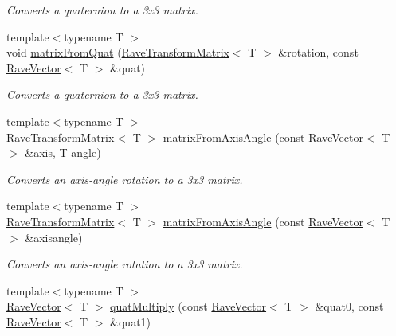 \begin{DoxyCompactItemize}
\begin{DoxyCompactList}\small\item\em Converts a quaternion to a 3x3 matrix. \item\end{DoxyCompactList}\item 
{\footnotesize template$<$typename T $>$ }\\void \hyperlink{group__affine__math_gacf10676c714b228545f93be252163d76}{matrixFromQuat} (\hyperlink{classOpenRAVE_1_1geometry_1_1RaveTransformMatrix}{RaveTransformMatrix}$<$ T $>$ \&rotation, const \hyperlink{classOpenRAVE_1_1geometry_1_1RaveVector}{RaveVector}$<$ T $>$ \&quat)
\begin{DoxyCompactList}\small\item\em Converts a quaternion to a 3x3 matrix. \item\end{DoxyCompactList}\item 
{\footnotesize template$<$typename T $>$ }\\\hyperlink{classOpenRAVE_1_1geometry_1_1RaveTransformMatrix}{RaveTransformMatrix}$<$ T $>$ \hyperlink{group__affine__math_gad596e9d743a4d08e54db0f01b1657002}{matrixFromAxisAngle} (const \hyperlink{classOpenRAVE_1_1geometry_1_1RaveVector}{RaveVector}$<$ T $>$ \&axis, T angle)
\begin{DoxyCompactList}\small\item\em Converts an axis-\/angle rotation to a 3x3 matrix. \item\end{DoxyCompactList}\item 
{\footnotesize template$<$typename T $>$ }\\\hyperlink{classOpenRAVE_1_1geometry_1_1RaveTransformMatrix}{RaveTransformMatrix}$<$ T $>$ \hyperlink{group__affine__math_ga25cf5562e674415477d2bcd80f95cc5b}{matrixFromAxisAngle} (const \hyperlink{classOpenRAVE_1_1geometry_1_1RaveVector}{RaveVector}$<$ T $>$ \&axisangle)
\begin{DoxyCompactList}\small\item\em Converts an axis-\/angle rotation to a 3x3 matrix. \item\end{DoxyCompactList}\item 
{\footnotesize template$<$typename T $>$ }\\\hyperlink{classOpenRAVE_1_1geometry_1_1RaveVector}{RaveVector}$<$ T $>$ \hyperlink{group__affine__math_gac36d0b93e56274bdfb6e1e648b829536}{quatMultiply} (const \hyperlink{classOpenRAVE_1_1geometry_1_1RaveVector}{RaveVector}$<$ T $>$ \&quat0, const \hyperlink{classOpenRAVE_1_1geometry_1_1RaveVector}{RaveVector}$<$ T $>$ \&quat1)

\end{DoxyCompactItemize}
